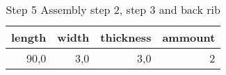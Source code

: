 \begin{table}[h!]
\centering
\caption{Step 5 Assembly step 2, step 3 and back rib}
\begin{tabular}{rrrr}
\toprule
 length &  width &  thickness &  ammount \\
\midrule
   90,0 &    3,0 &        3,0 &        2 \\
\bottomrule
\end{tabular}
\end{table}
